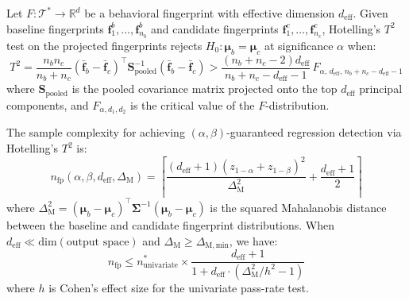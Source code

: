 \begin{theorem}
\label{thm:fingerprint-regression}
Let $F: \mathcal{T}^* \to \mathbb{R}^d$ be a behavioral fingerprint
with effective dimension $d_{\mathrm{eff}}$. Given baseline
fingerprints $\mathbf{f}_1^b, \ldots, \mathbf{f}_{n_b}^b$ and
candidate fingerprints $\mathbf{f}_1^c, \ldots, \mathbf{f}_{n_c}^c$,
Hotelling's $T^2$ test on the projected fingerprints rejects
$H_0: \boldsymbol{\mu}_b = \boldsymbol{\mu}_c$ at significance
$\alpha$ when:
\begin{equation}
\label{eq:hotelling}
  T^2 = \frac{n_b n_c}{n_b + n_c}
    (\bar{\mathbf{f}}_b - \bar{\mathbf{f}}_c)^\top
    \mathbf{S}_{\mathrm{pooled}}^{-1}
    (\bar{\mathbf{f}}_b - \bar{\mathbf{f}}_c)
  > \frac{(n_b + n_c - 2) d_{\mathrm{eff}}}{n_b + n_c -
    d_{\mathrm{eff}} - 1}\,
    F_{\alpha,\, d_{\mathrm{eff}},\, n_b + n_c - d_{\mathrm{eff}} - 1}
\end{equation}
where $\mathbf{S}_{\mathrm{pooled}}$ is the pooled covariance matrix
projected onto the top $d_{\mathrm{eff}}$ principal components, and
$F_{\alpha, d_1, d_2}$ is the critical value of the $F$-distribution.

The sample complexity for achieving $(\alpha, \beta)$-guaranteed
regression detection via Hotelling's $T^2$ is:
\begin{equation}
\label{eq:fingerprint-sample}
  n_{\mathrm{fp}}(\alpha, \beta, d_{\mathrm{eff}}, \Delta_{\mathrm{M}})
  = \left\lceil
    \frac{(d_{\mathrm{eff}} + 1)(z_{1-\alpha} + z_{1-\beta})^2}
         {\Delta_{\mathrm{M}}^2}
    + \frac{d_{\mathrm{eff}} + 1}{2}
  \right\rceil
\end{equation}
where $\Delta_{\mathrm{M}}^2 = (\boldsymbol{\mu}_b -
\boldsymbol{\mu}_c)^\top \boldsymbol{\Sigma}^{-1} (\boldsymbol{\mu}_b -
\boldsymbol{\mu}_c)$ is the squared Mahalanobis distance between the
baseline and candidate fingerprint distributions. When
$d_{\mathrm{eff}} \ll \mathrm{dim}(\text{output space})$ and
$\Delta_{\mathrm{M}} \geq \Delta_{\mathrm{M,min}}$, we have:
\begin{equation}
\label{eq:fingerprint-advantage}
  n_{\mathrm{fp}} \leq n^*_{\mathrm{univariate}} \times
    \frac{d_{\mathrm{eff}} + 1}{1 + d_{\mathrm{eff}} \cdot
    (\Delta_{\mathrm{M}}^2 / h^2 - 1)}
\end{equation}
where $h$ is Cohen's effect size for the univariate pass-rate test.
\end{theorem}

